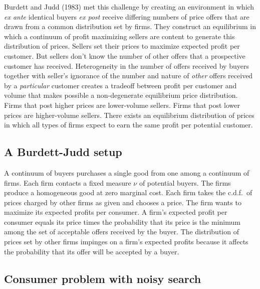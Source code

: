  Burdett and Judd (1983) met this challenge by creating an environment in which {\it ex ante\/} identical buyers
{\it ex post\/} receive differing numbers of price offers that are drawn from a common distribution set by firms. They construct an equilibrium
in which a continuum of profit maximizing sellers are content to generate this distribution of prices.  Sellers set their prices to maximize
 expected profit per customer. But   sellers don't know the number of other offers that a prospective customer has received.
   Heterogeneity in the number of offers received by buyers together with seller's ignorance of the number and nature of {\it other\/} offers received by a {\it particular\/} customer
creates a tradeoff between profit per customer and volume that makes possible a non-degenerate equilibrium price distribution.
Firms that post higher prices are lower-volume sellers. Firms that post lower prices are higher-volume sellers. There exists an equilibrium
distribution of prices  in which all types of firms
expect to earn the same profit per potential customer.

%

%
%

\subsection{A Burdett-Judd setup}

A continuum of buyers  purchases a single good from one among  a continuum of firms.  Each firm contacts a fixed measure  $\nu$ of potential
buyers.  The firms produce a homogeneous
good at zero marginal cost.  Each firm takes the c.d.f.\  of prices charged by other firms  as given and chooses  a price. The firm
 wants to maximize its expected profits per consumer.   A firm's expected profit
per consumer equals its price times the probability that its  price  is the minimum among the set of acceptable offers received by the buyer. The distribution
of prices set by other firms impinges on a firm's expected profits because it affects the probability that its offer will be accepted by a buyer.

\subsection{Consumer problem with noisy search}

